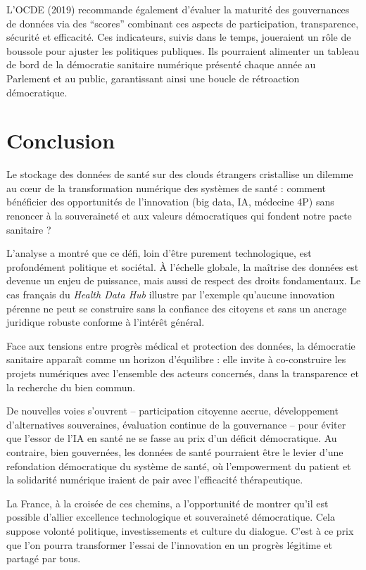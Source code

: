\documentclass[10pt,a4paper]{article} %
\begin{document}
L’OCDE (2019) recommande également d’évaluer la maturité des gouvernances de données via des “scores” combinant ces aspects de participation, transparence, sécurité et efficacité. Ces indicateurs, suivis dans le temps, joueraient un rôle de boussole pour ajuster les politiques publiques. Ils pourraient alimenter un tableau de bord de la démocratie sanitaire numérique présenté chaque année au Parlement et au public, garantissant ainsi une boucle de rétroaction démocratique.

\section*{Conclusion}

Le stockage des données de santé sur des clouds étrangers cristallise un dilemme au cœur de la transformation numérique des systèmes de santé : comment bénéficier des opportunités de l’innovation (big data, IA, médecine 4P) sans renoncer à la souveraineté et aux valeurs démocratiques qui fondent notre pacte sanitaire ?

L’analyse a montré que ce défi, loin d’être purement technologique, est profondément politique et sociétal. À l’échelle globale, la maîtrise des données est devenue un enjeu de puissance, mais aussi de respect des droits fondamentaux. Le cas français du \textit{Health Data Hub} illustre par l’exemple qu’aucune innovation pérenne ne peut se construire sans la confiance des citoyens et sans un ancrage juridique robuste conforme à l’intérêt général.

Face aux tensions entre progrès médical et protection des données, la démocratie sanitaire apparaît comme un horizon d’équilibre : elle invite à co-construire les projets numériques avec l’ensemble des acteurs concernés, dans la transparence et la recherche du bien commun.

De nouvelles voies s’ouvrent – participation citoyenne accrue, développement d’alternatives souveraines, évaluation continue de la gouvernance – pour éviter que l’essor de l’IA en santé ne se fasse au prix d’un déficit démocratique. Au contraire, bien gouvernées, les données de santé pourraient être le levier d’une refondation démocratique du système de santé, où l’empowerment du patient et la solidarité numérique iraient de pair avec l’efficacité thérapeutique.

La France, à la croisée de ces chemins, a l’opportunité de montrer qu’il est possible d’allier excellence technologique et souveraineté démocratique. Cela suppose volonté politique, investissements et culture du dialogue. C’est à ce prix que l’on pourra transformer l’essai de l’innovation en un progrès légitime et partagé par tous.


\newpage{}

\nocite{*} %
\printbibliography[
heading=bibintoc,
title={Références} %
]
\end{document}
